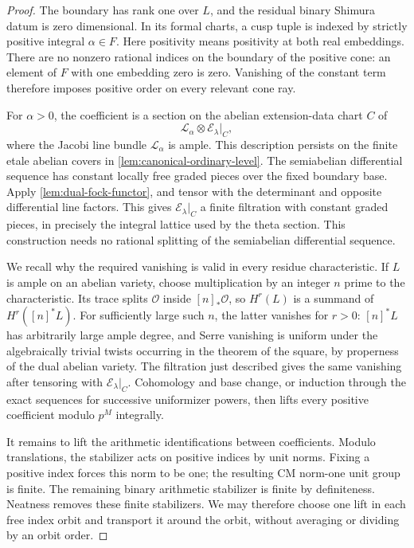 \begin{proof}
The boundary has rank one over $L$, and the residual binary Shimura
datum is zero dimensional.  In its formal charts, a cusp tuple is
indexed by strictly positive integral $\alpha\in F$.  Here positivity
means positivity at both real embeddings.  There are no nonzero
rational indices on the boundary of the positive cone: an element
of $F$ with one embedding zero is zero.  Vanishing of the constant
term therefore imposes positive order on every relevant cone ray.

For $\alpha>0$, the coefficient is a section on the abelian
extension-data chart $C$ of
\[
                 \mathcal L_\alpha\otimes\mathcal E_\lambda|_C,
\]
where the Jacobi line bundle $\mathcal L_\alpha$ is ample.  This
description persists on the finite etale abelian covers in
\cref{lem:canonical-ordinary-level}.  The semiabelian differential
sequence has constant locally free graded pieces over the fixed
boundary base.  Apply \cref{lem:dual-fock-functor}, and tensor with
the determinant and opposite differential line factors.  This
gives $\mathcal E_\lambda|_C$ a finite filtration with constant
graded pieces, in precisely the integral lattice used by the theta
section.  This construction needs no rational splitting of the
semiabelian differential sequence.

We recall why the required vanishing is valid in every residue
characteristic.  If $L$ is ample on an abelian variety, choose
multiplication by an integer $n$ prime to the characteristic.  Its
trace splits $\mathcal O$ inside $[n]_*\mathcal O$, so
$H^r(L)$ is a summand of $H^r([n]^*L)$.  For sufficiently large such
$n$, the latter vanishes for $r>0$: $[n]^*L$ has arbitrarily large
ample degree, and Serre vanishing is uniform under the algebraically
trivial twists occurring in the theorem of the square, by properness
of the dual abelian variety.  The filtration just described gives
the same vanishing after tensoring with
$\mathcal E_\lambda|_C$.  Cohomology and base change, or induction
through the exact sequences for successive uniformizer powers,
then lifts every positive coefficient modulo $p^M$ integrally.

It remains to lift the arithmetic identifications between
coefficients.  Modulo translations, the stabilizer acts on positive
indices by unit norms.  Fixing a positive index forces this norm to
be one; the resulting CM norm-one unit group is finite.  The
remaining binary arithmetic stabilizer is finite by definiteness.
Neatness removes these finite stabilizers.  We may therefore choose
one lift in each free index orbit and transport it around the orbit,
without averaging or dividing by an orbit order.


\end{proof}

